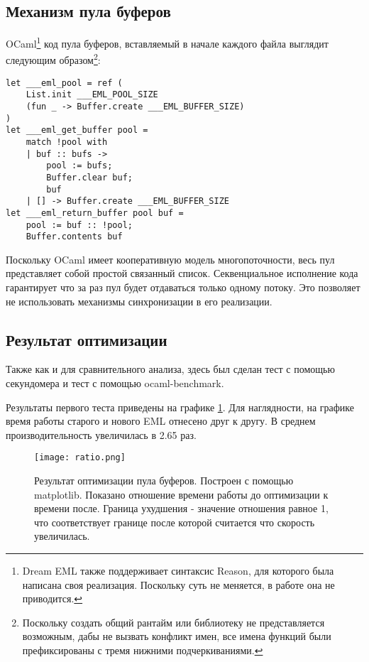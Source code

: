\subsection{Механизм пула буферов}

OCaml\footnote{Dream EML также поддерживает синтаксис Reason, для которого была написана своя реализация. Поскольку суть не меняется, в работе она не приводится.} код пула буферов, вставляемый в начале каждого файла выглядит следующим образом\footnote{
Поскольку создать общий рантайм или библиотеку не представляется возможным, дабы не вызвать конфликт имен, все имена функций были префиксированы с тремя нижними подчеркиваниями.}:

\begin{lstlisting}
let ___eml_pool = ref (
    List.init ___EML_POOL_SIZE 
    (fun _ -> Buffer.create ___EML_BUFFER_SIZE)
)
let ___eml_get_buffer pool =
    match !pool with
    | buf :: bufs ->
        pool := bufs;
        Buffer.clear buf;
        buf
    | [] -> Buffer.create ___EML_BUFFER_SIZE
let ___eml_return_buffer pool buf =
    pool := buf :: !pool;
    Buffer.contents buf
\end{lstlisting}

Поскольку OCaml имеет кооперативную модель многопоточности, весь пул представляет собой простой связанный список.
Секвенциальное исполнение кода гарантирует что за раз пул будет отдаваться только одному потоку.
Это позволяет не использовать механизмы синхронизации в его реализации.

\subsection{Результат оптимизации}

Также как и для сравнительного анализа, здесь был сделан тест с помощью секундомера и тест с помощью ocaml-benchmark.

Результаты первого теста приведены на графике \ref{fig:ratio}.
Для наглядности, на графике время работы старого и нового EML отнесено друг к другу.
В среднем производительность увеличилась в 2.65 раз.

\begin{figure}[h!]
    \texttt{[image: ratio.png]}
    \caption{Результат оптимизации пула буферов. Построен с помощью matplotlib. Показано отношение времени работы до оптимизации к времени после. Граница ухудшения - значение отношения равное 1, что соответствует границе после которой считается что скорость увеличилась.}
    \label{fig:ratio}
\end{figure}

